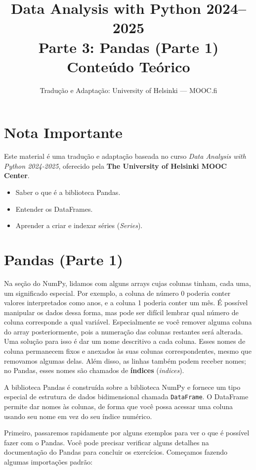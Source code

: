 \documentclass[11pt,a4paper]{article}
\title{\textbf{Data Analysis with Python 2024--2025}\\Parte 3: Pandas (Parte 1)\\\large Conteúdo Teórico}
\author{Tradução e Adaptação: University of Helsinki --- MOOC.fi}
\date{}
\begin{document}
\maketitle

\section*{Nota Importante}
Este material é uma tradução e adaptação baseada no curso \textit{Data Analysis with Python 2024-2025}, oferecido pela \textbf{The University of Helsinki MOOC Center}.

\begin{objetivos}
\begin{itemize}
    \item Saber o que é a biblioteca Pandas.
    \item Entender os DataFrames.
    \item Aprender a criar e indexar séries (\textit{Series}).
\end{itemize}
\end{objetivos}

\tableofcontents
\newpage

\section{Pandas (Parte 1)}

Na seção do NumPy, lidamos com alguns arrays cujas colunas tinham, cada uma, um significado especial. Por exemplo, a coluna de número 0 poderia conter valores interpretados como anos, e a coluna 1 poderia conter um mês. É possível manipular os dados dessa forma, mas pode ser difícil lembrar qual número de coluna corresponde a qual variável. Especialmente se você remover alguma coluna do array posteriormente, pois a numeração das colunas restantes será alterada. Uma solução para isso é dar um nome descritivo a cada coluna. Esses nomes de coluna permanecem fixos e anexados às suas colunas correspondentes, mesmo que removamos algumas delas. Além disso, as linhas também podem receber nomes; no Pandas, esses nomes são chamados de \textbf{índices} (\textit{indices}).

A biblioteca Pandas é construída sobre a biblioteca NumPy e fornece um tipo especial de estrutura de dados bidimensional chamada \texttt{DataFrame}. O DataFrame permite dar nomes às colunas, de forma que você possa acessar uma coluna usando seu nome em vez do seu índice numérico.

Primeiro, passaremos rapidamente por alguns exemplos para ver o que é possível fazer com o Pandas. Você pode precisar verificar alguns detalhes na documentação do Pandas para concluir os exercícios. Começamos fazendo algumas importações padrão:
\end{document}
